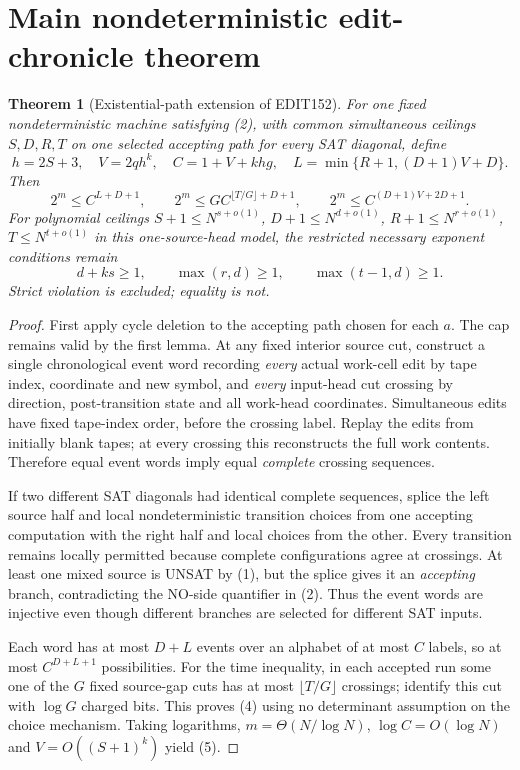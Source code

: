 \documentclass[11pt]{article}
\newtheorem{theorem}{Theorem}
\begin{document}
\section{Main nondeterministic edit-chronicle theorem}
\begin{theorem}[Existential-path extension of EDIT152]
For one fixed nondeterministic machine satisfying (2), with common \emph{simultaneous} ceilings $S,D,R,T$ on one selected accepting path for every SAT diagonal, define
\[
h=2S+3,\quad V=2qh^k,\quad C=1+V+khg,\quad
L=\min\{R+1,(D+1)V+D\}.
\]
Then
\[
\boxed{2^m\le C^{L+D+1}},\qquad
\boxed{2^m\le G C^{\lfloor T/G\rfloor+D+1}},\qquad
\boxed{2^m\le C^{(D+1)V+2D+1}}.
\tag{4}
\]
For polynomial ceilings $S+1\le N^{s+o(1)}$, $D+1\le N^{d+o(1)}$, $R+1\le N^{r+o(1)}$, $T\le N^{t+o(1)}$ in this one-source-head model, the restricted necessary exponent conditions remain
\[
\boxed{d+ks\ge1,\qquad \max(r,d)\ge1,\qquad
\max(t-1,d)\ge1.}
\tag{5}
\]
Strict violation is excluded; equality is not.
\end{theorem}
\begin{proof}
First apply cycle deletion to the accepting path chosen for each $a$. The cap remains valid by the first lemma. At any fixed interior source cut, construct a single chronological event word recording \emph{every} actual work-cell edit by tape index, coordinate and new symbol, and \emph{every} input-head cut crossing by direction, post-transition state and all work-head coordinates. Simultaneous edits have fixed tape-index order, before the crossing label. Replay the edits from initially blank tapes; at every crossing this reconstructs the full work contents. Therefore equal event words imply equal \emph{complete} crossing sequences.

If two different SAT diagonals had identical complete sequences, splice the left source half and local nondeterministic transition choices from one accepting computation with the right half and local choices from the other. Every transition remains locally permitted because complete configurations agree at crossings. At least one mixed source is UNSAT by (1), but the splice gives it an \emph{accepting} branch, contradicting the NO-side quantifier in (2). Thus the event words are injective even though different branches are selected for different SAT inputs.

Each word has at most $D+L$ events over an alphabet of at most $C$ labels, so at most $C^{D+L+1}$ possibilities. For the time inequality, in each accepted run some one of the $G$ fixed source-gap cuts has at most $\lfloor T/G\rfloor$ crossings; identify this cut with $\log G$ charged bits. This proves (4) using no determinant assumption on the choice mechanism. Taking logarithms, $m=\Theta(N/\log N)$, $\log C=O(\log N)$ and $V=O((S+1)^k)$ yield (5).
\end{proof}
\end{document}

